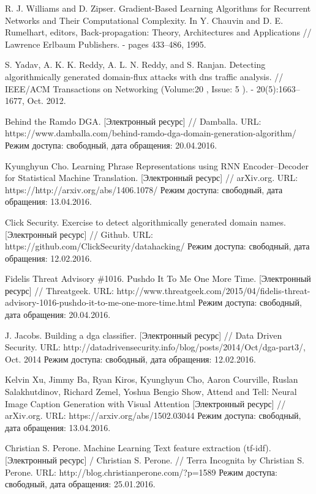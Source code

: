 \begin{thebibliography}{00}
    R. J. Williams and D. Zipser. Gradient-Based Learning Algorithms for Recurrent Networks and Their Computational Complexity. In Y. Chauvin and D. E. Rumelhart, editors, Back-propagation: Theory, Architectures and Applications // Lawrence Erlbaum Publishers. - pages 433–486, 1995.

    S. Yadav, A. K. K. Reddy, A. L. N. Reddy, and S. Ranjan.
    Detecting algorithmically generated domain-flux attacks with dns traffic analysis. //
    IEEE/ACM Transactions on Networking  (Volume:20 ,  Issue: 5 ). - 20(5):1663–1677, Oct. 2012.

    Behind the Ramdo DGA. [Электронный ресурс] // Damballa.
    URL: https://www.damballa.com/behind-ramdo-dga-domain-generation-algorithm/
    Режим доступа: свободный, дата обращения: 20.04.2016.

    Kyunghyun Cho.
    Learning Phrase Representations using RNN Encoder–Decoder for Statistical Machine Translation. [Электронный ресурс] // arXiv.org.
    URL: https://http://arxiv.org/abs/1406.1078/
    Режим доступа: свободный, дата обращения: 13.04.2016.

    Click Security. Exercise to detect algorithmically generated domain names.
    [Электронный ресурс] // Github.
    URL: https://github.com/ClickSecurity/datahacking/
    Режим доступа: свободный, дата обращения: 12.02.2016.

    Fidelis Threat Advisory \#1016. Pushdo It To Me One More Time.
    [Электронный ресурс] // Threatgeek.
    URL: http://www.threatgeek.com/2015/04/fidelis-threat-advisory-1016-pushdo-it-to-me-one-more-time.html
    Режим доступа: свободный, дата обращения: 20.04.2016.

    J. Jacobs. Building a dga classifier.
    [Электронный ресурс] // Data Driven Security.
    URL: http://datadrivensecurity.info/blog/posts/2014/Oct/dga-part3/, Oct. 2014
    Режим доступа: свободный, дата обращения: 12.02.2016.

    Kelvin Xu, Jimmy Ba, Ryan Kiros, Kyunghyun Cho, Aaron Courville, Ruslan Salakhutdinov, Richard Zemel, Yoshua Bengio
    Show, Attend and Tell: Neural Image Caption Generation with Visual Attention [Электронный ресурс] // arXiv.org.
    URL: https://arxiv.org/abs/1502.03044
    Режим доступа: свободный, дата обращения: 13.04.2016.

    Christian S. Perone. Machine Learning Text feature extraction (tf-idf). [Электронный ресурс] / Christian S. Perone. // Terra Incognita by Christian S. Perone.
    URL: http://blog.christianperone.com/?p=1589
    Режим доступа: свободный, дата обращения: 25.01.2016.


\end{thebibliography}
